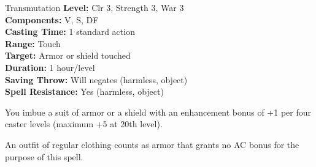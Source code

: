 {Transmutation}
{
	\textbf{Level:}
	Clr 3, Strength 3, War 3\\
	\textbf{Components:}
	V, S, DF\\
	\textbf{Casting Time:}
	1 standard action\\
	\textbf{Range:}
	Touch\\
	\textbf{Target:}
	Armor or shield touched\\
	\textbf{Duration:}
	1 hour/level\\
	\textbf{Saving Throw:}
	Will negates (harmless, object)\\
	\textbf{Spell Resistance:}
	Yes (harmless, object)\\
}
{
	You imbue a suit of armor or a shield with an enhancement bonus of +1 per four caster levels (maximum +5 at 20th level).

	An outfit of regular clothing counts as armor that grants no AC bonus for the purpose of this spell.

}
